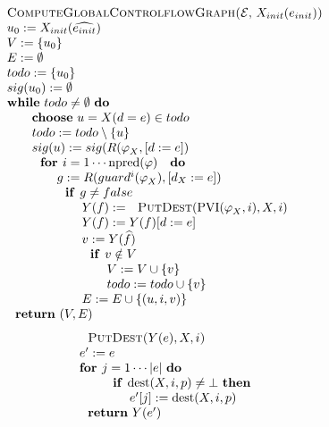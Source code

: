 \begin{equation*}
\begin{tabular}{l}
\textsc{ComputeGlobalControlflowGraph(}$\mathcal{E}$, $X_{init}(e_{init})$%
\textsc{)} \\ 
$u_{0}:=X_{init}(\widehat{e_{init}})$ \\ 
$V:=\{u_{0}\}$ \\ 
$E:=\emptyset $ \\ 
$todo:=\{u_{0}\}$ \\ 
$sig(u_{0}):=\emptyset $ \\ 
\textbf{while} $todo\neq \emptyset $ \textbf{do} \\ 
$\qquad $\textbf{choose} $u=X(d=e)\in todo$ \\ 
$\qquad todo:=todo\setminus \{u\}$ \\ 
$\qquad sig(u):=sig(R(\varphi _{X},[d:=e])$ \\ 
$\qquad \text{\textbf{for }}i=1\cdots \mathrm{npred}(\varphi )\text{ \textbf{%
do}}$ \\ 
$\qquad \qquad g:=R(guard^{i}(\varphi _{X}),[d_{X}:=e])$ \\ 
$\qquad \qquad \text{\textbf{if }}g\neq false$ \\ 
$\qquad \qquad \qquad Y(f):=\text{\textsc{PutDest}}(\mathrm{PVI}(\varphi
_{X},i),X,i)$ \\ 
$\qquad \qquad \qquad Y(f):=Y(f)[d:=e]$ \\ 
$\qquad \qquad \qquad v:=Y(\widehat{f})$ \\ 
$\qquad \qquad \qquad \text{\textbf{if }}v\notin V$ \\ 
$\qquad \qquad \qquad \qquad V:=V\cup \{v\}$ \\ 
$\qquad \qquad \qquad \qquad todo:=todo\cup \{v\}$ \\ 
$\qquad \qquad \qquad E:=E\cup \{(u,i,v)\}$ \\ 
$\text{\textbf{return} }(V,E)$%
\end{tabular}%
\end{equation*}%
\begin{equation*}
\begin{tabular}{l}
$\text{\textsc{PutDest}}$\textsc{(}$Y(e),X,i$\textsc{)} \\ 
$e^{\prime }:=e$ \\ 
\textbf{for }$j=1\cdots \left\vert e\right\vert $ \textbf{do} \\ 
$\qquad \text{\textbf{if }}\mathrm{dest}(X,i,p)\neq \bot $ \textbf{then} \\ 
$\qquad \qquad e^{\prime }[j]:=\mathrm{dest}(X,i,p)$ \\ 
$\text{\textbf{return} }Y(e^{\prime })$%
\end{tabular}%
\end{equation*}%
\newpage 

